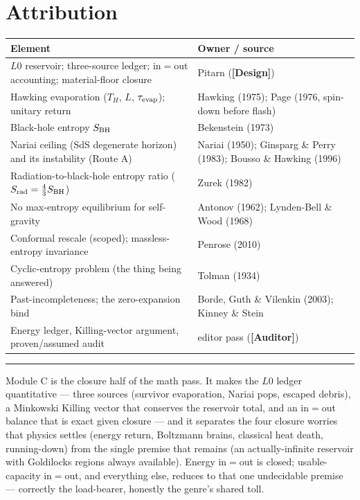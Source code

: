 \documentclass[11pt]{article}
\newcommand{\Design}{\textbf{\textcolor{purple!65!black}{[Design]}}}
\newcommand{\Auditor}{\textbf{\textcolor{teal!55!black}{[Auditor]}}}
\begin{document}
\section{Attribution}
\begin{center}\small
\begin{tabular}{@{}p{}p{}@{}}
\toprule
Element & Owner / source \\
\midrule
$L0$ reservoir; three-source ledger; in$=$out accounting; material-floor closure & Pitarn (\Design) \\
Hawking evaporation ($T_H$, $L$, $\tau_{\rm evap}$); unitary return & Hawking (1975); Page (1976, spin-down before flash) \\
Black-hole entropy $S_{\rm BH}$ & Bekenstein (1973) \\
Nariai ceiling (SdS degenerate horizon) and its instability (Route A) & Nariai (1950); Ginsparg \& Perry (1983); Bousso \& Hawking (1996) \\
Radiation-to-black-hole entropy ratio ($S_{\rm rad}=\tfrac43 S_{\rm BH}$) & Zurek (1982) \\
No max-entropy equilibrium for self-gravity & Antonov (1962); Lynden-Bell \& Wood (1968) \\
Conformal rescale (scoped); massless-entropy invariance & Penrose (2010) \\
Cyclic-entropy problem (the thing being answered) & Tolman (1934) \\
Past-incompleteness; the zero-expansion bind & Borde, Guth \& Vilenkin (2003); Kinney \& Stein \\
Energy ledger, Killing-vector argument, proven/assumed audit & editor pass (\Auditor) \\
\bottomrule
\end{tabular}
\end{center}

\vspace{4pt}\hrule\vspace{4pt}
{\small Module C is the closure half of the math pass. It makes the $L0$ ledger quantitative --- three sources (survivor evaporation, Nariai pops, escaped debris), a Minkowski Killing vector that conserves the reservoir total, and an in$=$out balance that is exact given closure --- and it separates the four closure worries that physics settles (energy return, Boltzmann brains, classical heat death, running-down) from the single premise that remains (an actually-infinite reservoir with Goldilocks regions always available). Energy in$=$out is closed; usable-capacity in$=$out, and everything else, reduces to that one undecidable premise --- correctly the load-bearer, honestly the genre's shared toll.}
\end{document}
